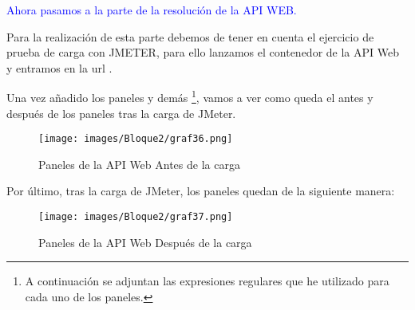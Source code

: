 \textcolor{blue}{Ahora pasamos a la parte de la resolución de la API WEB.}

Para la realización de esta parte debemos de tener en cuenta el ejercicio de prueba de carga con JMETER, para ello lanzamos el contenedor de la API Web y entramos en la url .

Una vez añadido los paneles y demás \footnote{A continuación se adjuntan las expresiones regulares que he utilizado para cada uno de los paneles.}, vamos a ver como queda el antes y después de los paneles tras la carga de JMeter.

\begin{figure}[H]
    \centering
    \texttt{[image: images/Bloque2/graf36.png]}
    \caption{Paneles de la API Web Antes de la carga}
    \label{fig:paneles_api}
\end{figure}

Por último, tras la carga de JMeter, los paneles quedan de la siguiente manera:
\begin{figure}[H]
    \centering
    \texttt{[image: images/Bloque2/graf37.png]}
    \caption{Paneles de la API Web Después de la carga}
    \label{fig:paneles_api_despues}
\end{figure}










